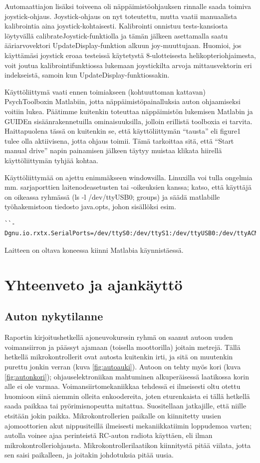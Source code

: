 \documentclass{article}
\begin{document}
Automaattiajon lisäksi toiveena oli näppäimistöohjauksen rinnalle saada toimiva joystick-ohjaus. Joystick-ohjaus on nyt toteutettu, mutta vaatii manuaalista kalibrointia aina joystick-kohtaisesti. Kalibrointi onnistuu tests-kansiosta löytyvällä calibrateJoystick-funktiolla ja tämän jälkeen asettamalla saatu ääriarvovektori UpdateDisplay-funktion alkuun joy-muuttujaan. Huomioi, jos käyttämäsi joystick eroaa testeissä käytetystä 8-ulotteisesta helikopteriohjaimesta, voit joutua kalibrointifunktiossa lukemaan joystickilta arvoja mittausvektorin eri indekseistä, samoin kun UpdateDisplay-funktiossakin.

Käyttöliittymä vaati ennen toimiakseen (kohtuuttoman kattavan) PsychToolboxin Matlabiin, jotta näppäimistöpainalluksia auton ohjaamiseksi voitiin lukea. Päätimme kuitenkin toteuttaa näppäimistön lukemisen Matlabin ja GUIDEn sisäänrakennetuilla ominaisuuksilla, jolloin erillistä toolboxia ei tarvita. Haittapuolena tässä on kuitenkin se, että käyttöliittymän ``tausta'' eli figure1 tulee olla aktiivisena, jotta ohjaus toimii. Tämä tarkoittaa sitä, että ``Start manual drive'' napin painamisen jälkeen täytyy muistaa klikata hiirellä käyttöliittymän tyhjää kohtaa.

Käyttöliittymää on ajettu enimmäkseen windowsilla. Linuxilla voi tulla ongelmia mm. sarjaporttien laitenodeasetusten tai -oikeuksien kanssa; katso, että käyttäjä on oikeassa ryhmässä (ls -l /dev/ttyUSB0; groups) ja säädä matlabille työhakemistoon tiedosto java.opts, johon sisällöksi esim.
\begin{verbatim}
``-Dgnu.io.rxtx.SerialPorts=/dev/ttyS0:/dev/ttyS1:/dev/ttyUSB0:/dev/ttyACM0''.
\end{verbatim}

Laitteen on oltava koneessa kiinni Matlabia käynnistäessä.

\section{Yhteenveto ja ajankäyttö}

\subsection{Auton nykytilanne}
Raportin kirjoitushetkellä ajoneuvokurssin ryhmä on saanut autoon uuden voimansiirron ja päässyt ajamaan (toisella moottorilla) joitain metrejä. Tällä hetkellä mikrokontrollerit ovat autosta kuitenkin irti, ja sitä on muutenkin purettu jonkin verran (kuva \ref{fig:autoauki}). Autoon on tehty myös kori (kuva \ref{fig:autonkori}); ohjauselektroniikan mahtuminen alkuperäisessä laatikossa korin alle ei ole varmaa. Voimansiirtomekaniikkaa tehdessä ei ilmeisesti oltu otettu huomioon siinä aiemmin olleita enkoodereita, joten eturenkaista ei tällä hetkellä saada paikkaa tai pyörimisnopeutta mitattua. Suositellaan jatkajille, että niille etsitään jokin paikka. Mikrokontrollerien paikalle on kiinnitetty uusien ajomoottorien akut nippusiteillä ilmeisesti mekaniikkatiimin loppudemoa varten; autolla voinee ajaa perinteistä RC-auton radiota käyttäen, eli ilman mikrokontrolleriohjausta. Mikrokontrollerilaatikon kiinnitystä pitää viilata, jotta sen saisi paikalleen, ja joitakin johdotuksia pitää uusia.
\end{document}
